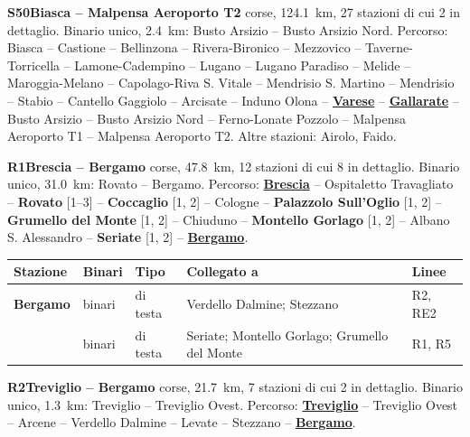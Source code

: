\medskip\noindent\hypertarget{lin:S50}{\textbf{S50\enspace Biasca -- Malpensa Aeroporto T2}} corse, \SI{124,1}{\km}, 27 stazioni di cui 2 in dettaglio. Binario unico, \SI{2,4}{\km}: Busto Arsizio -- Busto Arsizio Nord. Percorso: Biasca -- Castione -- Bellinzona -- Rivera-Bironico -- Mezzovico -- Taverne-Torricella -- Lamone-Cadempino -- Lugano -- Lugano Paradiso -- Melide -- Maroggia-Melano -- Capolago-Riva S. Vitale -- Mendrisio S. Martino -- Mendrisio -- Stabio -- Cantello Gaggiolo -- Arcisate -- Induno Olona -- \hyperlink{sta:S01205}{\textbf{Varese}} -- \hyperlink{sta:S01030}{\textbf{Gallarate}} -- Busto Arsizio -- Busto Arsizio Nord -- Ferno-Lonate Pozzolo -- Malpensa Aeroporto T1 -- Malpensa Aeroporto T2. Altre stazioni: Airolo, Faido.

\medskip\noindent\hypertarget{lin:R1}{\textbf{R1\enspace Brescia -- Bergamo}} corse, \SI{47,8}{\km}, 12 stazioni di cui 8 in dettaglio. Binario unico, \SI{31,0}{\km}: Rovato -- Bergamo. Percorso: \hyperlink{sta:S09999}{\textbf{Brescia}} -- Ospitaletto Travagliato -- \hypertarget{sta:S01714}{\textbf{Rovato}} [1--3] -- \hypertarget{sta:S01540}{\textbf{Coccaglio}} [1, 2] -- Cologne -- \hypertarget{sta:S01538}{\textbf{Palazzolo Sull'Oglio}} [1, 2] -- \hypertarget{sta:S01537}{\textbf{Grumello del Monte}} [1, 2] -- Chiuduno -- \hypertarget{sta:S01535}{\textbf{Montello Gorlago}} [1, 2] -- Albano S. Alessandro -- \hypertarget{sta:S01533}{\textbf{Seriate}} [1, 2] -- \hyperlink{sta:S01529}{\textbf{Bergamo}}.
{\footnotesize\setlength{\LTpre}{2pt}\setlength{\LTpost}{0pt}
\begin{longtable}{@{}>{\raggedright\arraybackslash}p{}>{\raggedright\arraybackslash}p{}>{\raggedright\arraybackslash}p{}>{\raggedright\arraybackslash}p{}>{\raggedright\arraybackslash}p{}@{}}
\toprule
Stazione & Binari & Tipo & Collegato a & Linee \\
\midrule
\endhead
\leavevmode\hypertarget{sta:S01529}{}\textbf{Bergamo} & 2 binari & di testa & Verdello Dalmine; Stezzano & R2, RE2 \\
 & 1 binari & di testa & Seriate; Montello Gorlago; Grumello del Monte & R1, R5 \\
\bottomrule
\end{longtable}}

\medskip\noindent\hypertarget{lin:R2}{\textbf{R2\enspace Treviglio -- Bergamo}} corse, \SI{21,7}{\km}, 7 stazioni di cui 2 in dettaglio. Binario unico, \SI{1,3}{\km}: Treviglio -- Treviglio Ovest. Percorso: \hyperlink{sta:S01708}{\textbf{Treviglio}} -- Treviglio Ovest -- Arcene -- Verdello Dalmine -- Levate -- Stezzano -- \hyperlink{sta:S01529}{\textbf{Bergamo}}.

